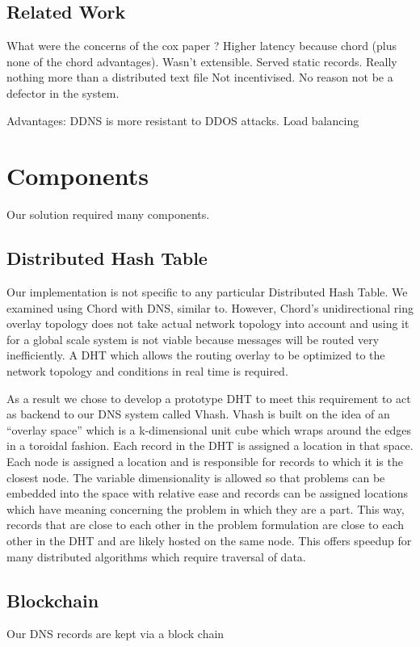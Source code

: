 \documentclass[11pt]{ieeetran} %
\begin{document}
\subsection{Related Work}
What were the concerns of the cox paper \cite{cox}?  
Higher latency because chord (plus none of the chord advantages). 
Wasn't extensible.  Served static records.  Really nothing more than a distributed text file
Not incentivised. No reason not be a defector in the system.

Advantages:  DDNS is more resistant to DDOS attacks.  Load balancing 


\section{Components}

Our solution required many components.

\subsection{Distributed Hash Table}
Our implementation is not specific to any particular Distributed Hash Table.  We examined using Chord \cite{chord} with DNS, similar to\cite{cox}.  However, Chord’s unidirectional ring overlay topology does not take actual network topology into account and using it for a global scale system is not viable because messages will be routed very inefficiently. A DHT which allows the routing overlay to be optimized to the network topology and conditions in real time is required.

As a result we chose to develop a prototype DHT to meet this requirement to act as backend to our DNS system called Vhash. Vhash is built on the idea of an “overlay space” which is a k-dimensional unit cube which wraps around the edges in a toroidal fashion. Each record in the DHT is assigned a location in that space. Each node is assigned a location and is responsible for records to which it is the closest node. The variable dimensionality is allowed so that problems can be embedded into the space with relative ease and records can be assigned locations which have meaning concerning the problem in which they are a part. This way, records that are close to each other in the problem formulation are close to each other in the DHT and are likely hosted on the same node. This offers speedup for many distributed algorithms which require traversal of data.

\subsection{Blockchain}
Our DNS records are kept via a block chain
\end{document}
